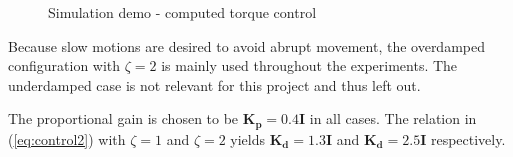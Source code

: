 \begin{figure}[H]
    \centering



    \caption{Simulation demo - computed torque control}
    \label{fig:case1-1}
\end{figure}

Because slow motions are desired to avoid abrupt movement, the overdamped configuration with $\zeta = 2$ is mainly used throughout the experiments. The underdamped case is not relevant for this project and thus left out.

The proportional gain is chosen to be $\mathbf{K_p} = 0.4 \mathbf{I}$ in all cases. The relation in (\ref{eq:control2}) with $\zeta=1$ and $\zeta=2$ yields $\mathbf{K_d} = 1.3 \mathbf{I}$ and $\mathbf{K_d} = 2.5 \mathbf{I}$ respectively.




